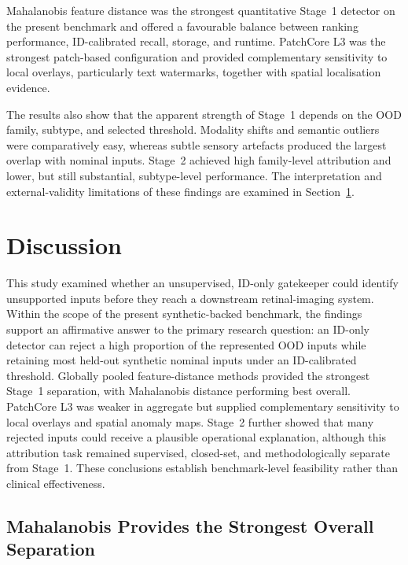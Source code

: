 \documentclass[fleqn,12pt]{olplainarticle}
\begin{document}
Mahalanobis feature distance was the strongest quantitative Stage~1 detector
on the present benchmark and offered a favourable balance between ranking
performance, ID-calibrated recall, storage, and runtime. PatchCore L3 was the
strongest patch-based configuration and provided complementary sensitivity
to local overlays, particularly text watermarks, together with spatial
localisation evidence.

The results also show that the apparent strength of Stage~1 depends on the OOD
family, subtype, and selected threshold. Modality shifts and semantic outliers
were comparatively easy, whereas subtle sensory artefacts produced the
largest overlap with nominal inputs. Stage~2 achieved high family-level
attribution and lower, but still substantial, subtype-level performance. The
interpretation and external-validity limitations of these findings are
examined in Section~\ref{sec:discussion}.

\clearpage
\endgroup

\section{Discussion}
\label{sec:discussion}

This study examined whether an unsupervised, ID-only gatekeeper could identify
unsupported inputs before they reach a downstream retinal-imaging system.
Within the scope of the present synthetic-backed benchmark, the findings
support an affirmative answer to the primary research question: an ID-only
detector can reject a high proportion of the represented OOD inputs while
retaining most held-out synthetic nominal inputs under an ID-calibrated
threshold. Globally pooled feature-distance methods provided the strongest
Stage~1 separation, with Mahalanobis distance performing best overall.
PatchCore L3 was weaker in aggregate but supplied complementary sensitivity to
local overlays and spatial anomaly maps. Stage~2 further showed that many
rejected inputs could receive a plausible operational explanation, although
this attribution task remained supervised, closed-set, and methodologically
separate from Stage~1. These conclusions establish benchmark-level feasibility
rather than clinical effectiveness.

\subsection{Mahalanobis Provides the Strongest Overall Separation}
\label{subsec:discussion_stage1}
\end{document}
